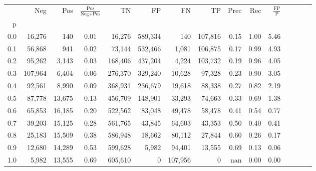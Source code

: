 \begin{tabular}{rrrcrrrrrrrrrrr}
\toprule
{} &      Neg &     Pos & $\frac{\text{Pos}}{\text{Neg}+\text{Pos}}$ &       TN &       FP &       FN &       TP &  Prec &   Rec & $\frac{\text{FP}}{\text{P}}$ \\
p   &          &         &                                            &          &          &          &          &       &       &                              \\
\midrule
0.0 &   16,276 &     140 &                                       0.01 &   16,276 &  589,334 &      140 &  107,816 &  0.15 &  1.00 &                         5.46 \\
0.1 &   56,868 &     941 &                                       0.02 &   73,144 &  532,466 &    1,081 &  106,875 &  0.17 &  0.99 &                         4.93 \\
0.2 &   95,262 &   3,143 &                                       0.03 &  168,406 &  437,204 &    4,224 &  103,732 &  0.19 &  0.96 &                         4.05 \\
0.3 &  107,964 &   6,404 &                                       0.06 &  276,370 &  329,240 &   10,628 &   97,328 &  0.23 &  0.90 &                         3.05 \\
0.4 &   92,561 &   8,990 &                                       0.09 &  368,931 &  236,679 &   19,618 &   88,338 &  0.27 &  0.82 &                         2.19 \\
0.5 &   87,778 &  13,675 &                                       0.13 &  456,709 &  148,901 &   33,293 &   74,663 &  0.33 &  0.69 &                         1.38 \\
0.6 &   65,853 &  16,185 &                                       0.20 &  522,562 &   83,048 &   49,478 &   58,478 &  0.41 &  0.54 &                         0.77 \\
0.7 &   39,203 &  15,125 &                                       0.28 &  561,765 &   43,845 &   64,603 &   43,353 &  0.50 &  0.40 &                         0.41 \\
0.8 &   25,183 &  15,509 &                                       0.38 &  586,948 &   18,662 &   80,112 &   27,844 &  0.60 &  0.26 &                         0.17 \\
0.9 &   12,680 &  14,289 &                                       0.53 &  599,628 &    5,982 &   94,401 &   13,555 &  0.69 &  0.13 &                         0.06 \\
1.0 &    5,982 &  13,555 &                                       0.69 &  605,610 &        0 &  107,956 &        0 &   nan &  0.00 &                         0.00 \\
\bottomrule
\end{tabular}
